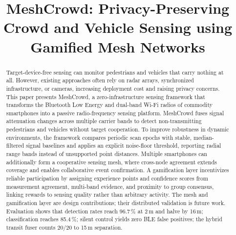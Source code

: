 \documentclass[conference,10pt]{IEEEtran}
\begin{document}
\title{MeshCrowd: Privacy-Preserving Crowd and Vehicle Sensing using Gamified Mesh Networks}

\author{
\and
{}
\and
{}
}

\maketitle
\thispagestyle{dessert}


\begin{abstract}
Target-device-free sensing can monitor pedestrians and vehicles that
carry nothing at all. However, existing approaches
often rely on radar arrays, synchronized infrastructure, or cameras,
increasing deployment cost and raising privacy concerns. This paper presents
MeshCrowd, a zero-infrastructure sensing framework that transforms the
Bluetooth Low Energy and dual-band Wi-Fi radios of commodity smartphones into
a passive radio-frequency sensing platform. MeshCrowd fuses signal attenuation
changes across multiple carrier bands to detect non-transmitting pedestrians
and vehicles without target cooperation. To improve robustness in dynamic
environments, the framework compares periodic scan epochs with stable,
median-filtered signal baselines and applies an explicit noise-floor
threshold, reporting radial range bands instead of unsupported point
distances. Multiple smartphones can additionally form a cooperative sensing
mesh, where cross-node agreement extends coverage and enables collaborative
event confirmation. A gamification layer incentivizes reliable participation
by assigning experience points and confidence scores from measurement
agreement, multi-band evidence, and proximity to group consensus, linking rewards to sensing quality rather than arbitrary activity. The mesh and gamification layer are design contributions; their distributed validation is future work. Evaluation shows that detection rates reach 96.7\,\% at 2\,m
and halve by 16\,m; classification reaches 85.4\,\%; silent control yields zero BLE
false positives; the hybrid transit fuser counts 20/20 to 15\,m separation. 
\end{abstract}
\end{document}
